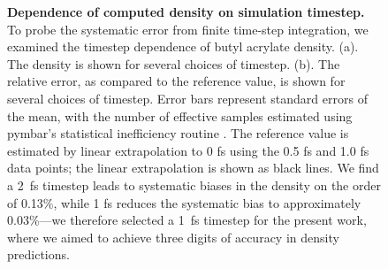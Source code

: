 \documentclass[aip, jcp, reprint]{revtex4-1}  %
\begin{document}
\begin{figure}


\caption{
{\bf Dependence of computed density on simulation timestep.}
To probe the systematic error from finite time-step integration, we examined the timestep dependence of butyl acrylate density.  
(a).  The density is shown for several choices of timestep.  
(b).  The relative error, as compared to the reference value, is shown for several choices of timestep.  
Error bars represent standard errors of the mean, with the number of effective samples estimated using pymbar's statistical inefficiency routine \cite{shirts2008statistically}.  
The reference value is estimated by linear extrapolation to 0 fs using the 0.5 fs and 1.0 fs data points; the linear extrapolation is shown as black lines.  
We find a 2~fs timestep leads to systematic biases in the density on the order of 0.13\%, while 1 fs reduces the systematic bias to approximately 0.03\%---we therefore selected a 1~fs timestep for the present work, where we aimed to achieve three digits of accuracy in density predictions.
}
\label{figure:timestep}

\end{figure}
\end{document}
